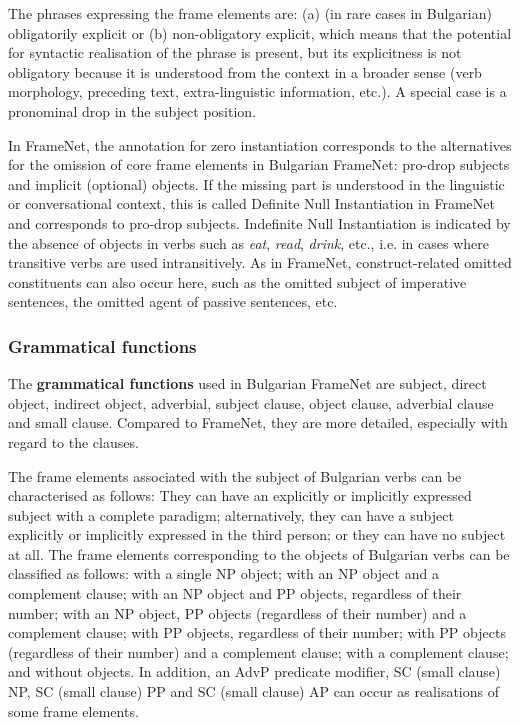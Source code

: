 \documentclass[output=paper,colorlinks,citecolor=brown]{langscibook}
\begin{document}

The phrases expressing the frame elements are: (a) (in rare cases in Bulgarian) obligatorily explicit or (b) non-obligatory explicit, which means that the potential for syntactic realisation of the phrase is present, but its explicitness is not obligatory because it is understood from the context in a broader sense (verb morphology, preceding text, extra-linguistic information, etc.). A special case is a pronominal drop in the subject position.

In FrameNet, the annotation for zero instantiation corresponds to the alternatives for the omission of core frame elements in Bulgarian FrameNet: pro-drop subjects and implicit (optional) objects. If the missing part is understood in the linguistic or conversational context, this is called Definite Null Instantiation in FrameNet and corresponds to pro-drop subjects. Indefinite Null Instantiation is indicated by the absence of objects in verbs such as \textit{eat}, \textit{read}, \textit{drink}, etc., i.e. in cases where transitive verbs are used intransitively. As in FrameNet, construct-related omitted constituents can also occur here, such as the omitted subject of imperative sentences, the omitted agent of passive sentences, etc.

\subsubsection{Grammatical functions}

The \textbf{grammatical functions} used in Bulgarian FrameNet are subject, direct object, indirect object, adverbial, subject clause, object clause, adverbial clause and small clause. Compared to FrameNet, they are more detailed, especially with regard to the clauses.

The frame elements associated with the subject of Bulgarian verbs can be characterised as follows: They can have an explicitly or implicitly expressed subject with a complete paradigm; alternatively, they can have a subject explicitly or implicitly expressed in the third person; or they can have no subject at all. The frame elements corresponding to the objects of Bulgarian verbs can be classified as follows: with a single NP object; with an NP object and a complement clause; with an NP object and PP objects, regardless of their number; with an NP object, PP objects (regardless of their number) and a complement clause; with PP objects, regardless of their number; with PP objects (regardless of their number) and a complement clause; with a complement clause; and without objects. In addition, an AdvP predicate modifier, SC (small clause) NP, SC (small clause) PP and SC (small clause) AP can occur as realisations of some frame elements.
\end{document}

